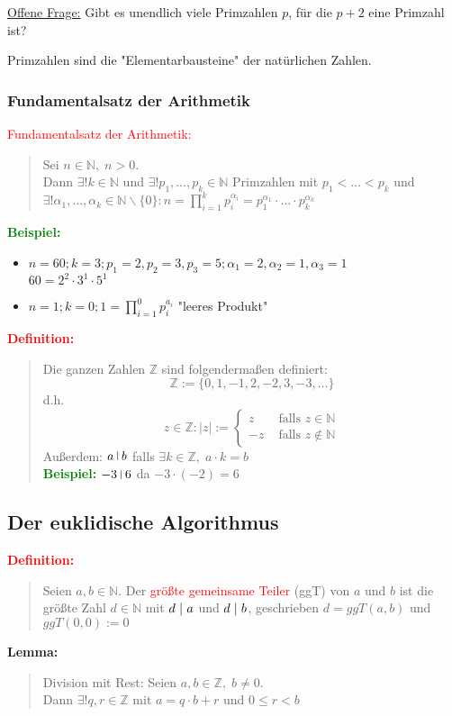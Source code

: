 \documentclass{article}
\newcommand{\smsp}{\phantom{\hspace{3px}}}
\newcommand{\red}[1]{\textcolor{red}{#1}}
\newcommand{\green}[1]{\textcolor{green}{#1}}
\newcommand{\dgr}[1]{\textcolor{dgr}{#1}}
\newcommand{\ex}{\green{\textbf{Beispiel: }}}
\newcommand{\de}[1]{\red{\textbf{Definition: }}\begin{quote}#1\end{quote}}
\newcommand{\lem}[1]{\dgr{\textbf{Lemma: }}\begin{quote}#1\end{quote}}
\newcommand{\N}{\mathbb{N}}
\newcommand{\Z}{\mathbb{Z}}
\newcommand{\vst}{\smsp \vline \smsp}
\renewcommand{\st}{\smsp | \smsp}
\newcommand{\bs}{\backslash}
\begin{document}
\underline{Offene Frage:} Gibt es unendlich viele Primzahlen $p$, für die $p + 2$ eine Primzahl ist?

Primzahlen sind die "Elementarbausteine" der natürlichen Zahlen.

\subsubsection{Fundamentalsatz der Arithmetik}

\red{Fundamentalsatz der Arithmetik:}
\begin{quote}
    Sei $n \in \N, \; n > 0$.\\
    Dann $\exists! k \in \N$ und $\exists! p_1,\dots,p_k \in \N$ Primzahlen mit $p_1 < \dots < p_k$ und $\exists! \alpha_1, \dots, \alpha_k \in \N \bs \{0\}: n = \prod_{i = 1}^{k} p_i^{\alpha_i} = p_1^{\alpha_1} \cdot \dots \cdot p_k^{\alpha_k}$
\end{quote}

\ex \begin{itemize}
    \item $n = 60; k = 3; p_1 = 2, p_2 = 3, p_3 = 5; \alpha_1 = 2, \alpha_2 = 1, \alpha_3 = 1$\\
    $60 = 2^2 \cdot 3^1 \cdot 5^1$
    \item $n = 1; k = 0; 1 = \prod_{i = 1}^{0} p_i^{a_i}$ "leeres Produkt"
\end{itemize}

\newpage
\de{
    Die ganzen Zahlen $\Z$ sind folgendermaßen definiert:
    \[
        \Z := \{0, 1, -1, 2, -2, 3, -3, \dots\}
    \]
    d.h.
    \[
        z \in \Z: |z| := \begin{cases}
            z & \text{ falls } z \in \N\\
            -z & \text{ falls } z \notin \N
        \end{cases}
    \]
    Außerdem: $a \vst b$ falls $\exists k \in \Z, \; a \cdot k = b$\\
    \ex $-3 \vst 6$ da $-3 \cdot (-2) = 6$
}

\subsection{Der euklidische Algorithmus}

\de{
    Seien $a,b \in \N$. Der \red{größte gemeinsame Teiler} (ggT) von $a$ und $b$ ist die größte Zahl $d \in \N$ mit $d \st a$ und $d \st b$, geschrieben $d = ggT(a,b)$ und $ggT(0,0) := 0$
}

\lem{
    Division mit Rest: Seien $a, b \in \Z, \; b \neq 0$.\\
    Dann $\exists! q,r \in \Z$ mit $a = q \cdot b + r$ und $0 \leq r < b$
}
\end{document}
